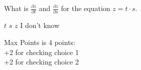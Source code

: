 \documentclass[addpoints, answers]{exam}
\begin{document}
\begin{questions}
	
\question[4] What is $\displaystyle \frac{\partial z}{\partial t} $ and $\displaystyle \frac{\partial z}{\partial s}$ for the equation $z=t \cdot s$.	
    
\begin{checkboxes}
\choice $t$
\choice $s$
\choice $z$
\choice I don't know
\end{checkboxes}
    
\begin{solution}
Max Points is 4 points:\\ +2 for checking choice 1\\ +2 for checking choice 2
\end{solution}
\end{questions}
\end{document}

